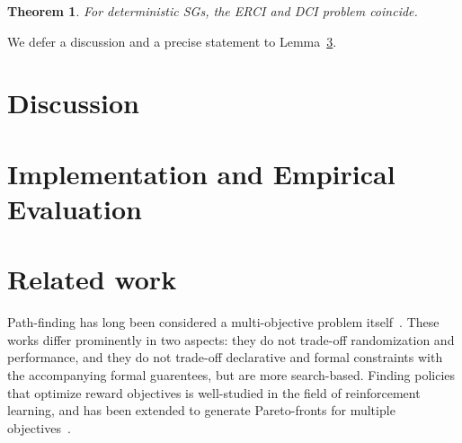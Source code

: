 \documentclass[conference]{IEEEtran}
\newtheorem{theorem}{Theorem}
\theoremstyle{remark}
\newcommand{\sg}{\mathcal{G}}
\newcommand{\eventually}[1]{\lozenge^{\leq #1}}
\newcommand{\sched}{\sigma}
\begin{document}
\begin{theorem}
	For deterministic SGs, the ERCI and DCI problem coincide.
\end{theorem}
We defer a discussion and a precise statement to Lemma~\ref{}.

%

\section{Discussion}


\section{Implementation and Empirical Evaluation}

\section{Related work}
\color{red}
\cite{DBLP:journals/corr/abs-2009-10883}
\cite{DBLP:journals/jcss/BrazdilCFK17}
\color{black}



Path-finding has long been considered a multi-objective problem itself~\cite{DBLP:conf/icra/AmigoniG05,DBLP:journals/eswa/NazarahariKD19,DBLP:conf/icml/XuTMRSM20}.
These works differ prominently in two aspects: they do not trade-off randomization and performance, and they do not trade-off declarative and formal constraints with the accompanying formal guarentees, but are more search-based. 
Finding policies that optimize reward objectives is well-studied in the field of reinforcement learning, and has been extended to generate Pareto-fronts for multiple objectives~\cite{DBLP:conf/icml/NatarajanT05,DBLP:conf/adprl/ParisiPSBR14}.
\end{document}
